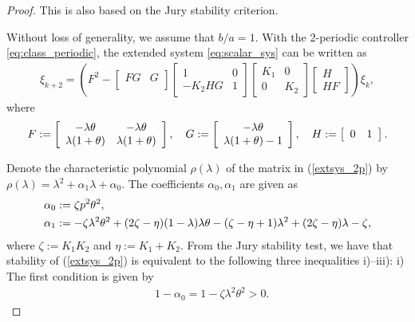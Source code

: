 \documentclass[letterpaper, 12pt, draftcls, onecolumn]{ieeeconf}
\begin{document}
\begin{proof}
This is also based on the Jury stability criterion.

Without loss of generality, we assume that $b/a = 1$.
With the 2-periodic controller \eqref{eq:class_periodic}, 
the extended system \eqref{eq:scalar_sys} can be written as
\begin{align}
\xi_{k+2}=
\left(F^2
-\left[
\begin{array}{cc}
F G & G\\
\end{array}\right]
\left[
\begin{array}{cc}
1 & 0\\
-K_2 H G & 1
\end{array}\right]
\left[
\begin{array}{cc}
K_1 & 0\\
0 & K_2
\end{array}\right]
\left[
\begin{array}{c}
H\\
H F
\end{array}\right]
\right)\xi_k,\label{extsys_2p}
\end{align}
where
\begin{align}
F:=\left[
\begin{array}{cc}
-\lambda\theta & -\lambda\theta\\
\lambda(1+\theta) & \lambda(1+\theta)
\end{array}\right],\quad
G:=\left[
\begin{array}{c}
-\lambda\theta \\
\lambda(1+\theta)-1
\end{array}\right],\quad
H:=\left[
\begin{array}{cc}
0 & 1\\
\end{array}\right].\notag
\end{align}


Denote the characteristic polynomial $\rho(\lambda)$ of the matrix in
(\ref{extsys_2p}) by $\rho(\lambda)=\lambda^2+\alpha_1\lambda+\alpha_0$.
The coefficients $\alpha_0, \alpha_1$ are given as
\begin{align}
&\alpha_0:=\zeta p^2\theta^2,\notag\\
&\alpha_1:=
-\zeta \lambda^2 \theta^2
+(2\zeta-\eta)(1-\lambda)\lambda\theta
-(\zeta-\eta+1)\lambda^2+(2\zeta-\eta)\lambda-\zeta,\notag
\end{align}
where $\zeta:=K_1K_2$ and $\eta:=K_1+K_2$.
From the Jury stability test, we have that stability of (\ref{extsys_2p}) is
equivalent to the following three inequalities i)--iii):
i) The first condition is given by
\begin{align}
&1-\alpha_0
=1-\zeta \lambda^2\theta^2>0.
\label{2pJury-1}
\end{align}


\end{proof}
\end{document}
